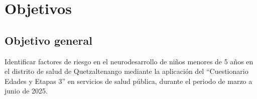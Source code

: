 \documentclass[11pt,letterpaper]{report}
\newcommand{\tiempito}{marzo a junio de 2025}
\begin{document}
	\chapter{Objetivos}
\section{Objetivo general}
Identificar factores de riesgo en el neurodesarrollo de niños menores de 5 años
en el distrito de salud de Quetzaltenango mediante la aplicación del 
“Cuestionario Edades y Etapas 3” en servicios de salud pública, durante el
periodo de \tiempito.

\printbibliography
\end{document}
